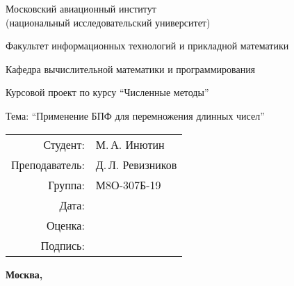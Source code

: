\begin{titlepage}
\begin{center}
\bfseries

{\Large Московский авиационный институт \\ (национальный исследовательский университет)

}

\vspace{48pt}

{\large Факультет информационных технологий и прикладной математики
}

\vspace{36pt}

{\large Кафедра вычислительной математики и программирования

}

\vspace{48pt}

Курсовой проект по курсу \enquote{Численные методы}

Тема: \enquote{Применение БПФ для перемножения длинных чисел}

\end{center}

\vspace{72pt}

\begin{flushright}
\begin{tabular}{rl}
Студент: & М.\,А. Инютин \\
Преподаватель: & Д.\,Л. Ревизников \\
Группа: & М8О-307Б-19 \\
Дата: & \\
Оценка: & \\
Подпись: & \\
\end{tabular}
\end{flushright}

\vfill

\begin{center}
\bfseries
Москва, \the\year
\end{center}
\end{titlepage}

\pagebreak
